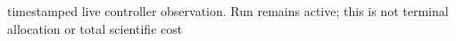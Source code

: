 \documentclass[10pt]{article}
\begin{document}
\allowbreak{}t\allowbreak{}i\allowbreak{}m\allowbreak{}e\allowbreak{}s\allowbreak{}t\allowbreak{}a\allowbreak{}m\allowbreak{}p\allowbreak{}e\allowbreak{}d\allowbreak{} \allowbreak{}l\allowbreak{}i\allowbreak{}v\allowbreak{}e\allowbreak{} \allowbreak{}c\allowbreak{}o\allowbreak{}n\allowbreak{}t\allowbreak{}r\allowbreak{}o\allowbreak{}l\allowbreak{}l\allowbreak{}e\allowbreak{}r\allowbreak{} \allowbreak{}o\allowbreak{}b\allowbreak{}s\allowbreak{}e\allowbreak{}r\allowbreak{}v\allowbreak{}a\allowbreak{}t\allowbreak{}i\allowbreak{}o\allowbreak{}n\allowbreak{}.\allowbreak{} \allowbreak{}R\allowbreak{}u\allowbreak{}n\allowbreak{} \allowbreak{}r\allowbreak{}e\allowbreak{}m\allowbreak{}a\allowbreak{}i\allowbreak{}n\allowbreak{}s\allowbreak{} \allowbreak{}a\allowbreak{}c\allowbreak{}t\allowbreak{}i\allowbreak{}v\allowbreak{}e\allowbreak{};\allowbreak{} \allowbreak{}t\allowbreak{}h\allowbreak{}i\allowbreak{}s\allowbreak{} \allowbreak{}i\allowbreak{}s\allowbreak{} \allowbreak{}n\allowbreak{}o\allowbreak{}t\allowbreak{} \allowbreak{}t\allowbreak{}e\allowbreak{}r\allowbreak{}m\allowbreak{}i\allowbreak{}n\allowbreak{}a\allowbreak{}l\allowbreak{} \allowbreak{}a\allowbreak{}l\allowbreak{}l\allowbreak{}o\allowbreak{}c\allowbreak{}a\allowbreak{}t\allowbreak{}i\allowbreak{}o\allowbreak{}n\allowbreak{} \allowbreak{}o\allowbreak{}r\allowbreak{} \allowbreak{}t\allowbreak{}o\allowbreak{}t\allowbreak{}a\allowbreak{}l\allowbreak{} \allowbreak{}s\allowbreak{}c\allowbreak{}i\allowbreak{}e\allowbreak{}n\allowbreak{}t\allowbreak{}i\allowbreak{}f\allowbreak{}i\allowbreak{}c\allowbreak{} \allowbreak{}c\allowbreak{}o\allowbreak{}s\allowbreak{}t\allowbreak{} 
\end{document}
